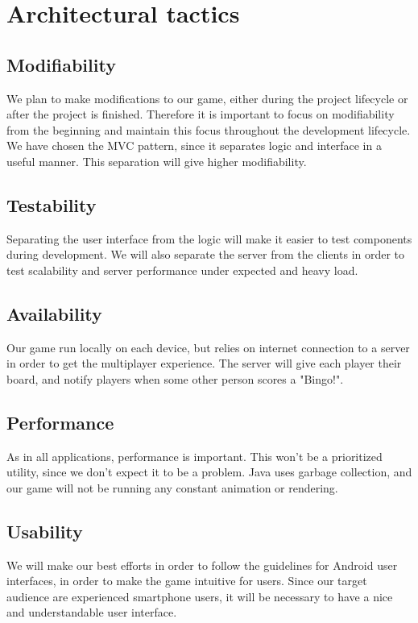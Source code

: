 \section{Architectural tactics}
\label{sec:architecturaltactics}

\subsection{Modifiability} 
We plan to make modifications to our game, either during the project lifecycle or after the project is finished. Therefore it is important to focus on modifiability from the beginning and maintain this focus throughout the development lifecycle. 
We have chosen the MVC pattern, since it separates logic and interface in a useful manner. This separation will give higher modifiability.

\subsection{Testability}
Separating the user interface from the logic will make it easier to test components during development. We will also separate the server from the clients in order to test scalability and server performance under expected and heavy load.


\subsection{Availability} 
Our game run locally on each device, but relies on internet connection to a server in order to get the multiplayer experience. The server will give each player their board, and notify players when some other person scores a "Bingo!". 


\subsection{Performance}
As in all applications, performance is important. This won't be a prioritized utility, since we don't expect it to be a problem. Java uses garbage collection, and our game will not be running any constant animation or rendering.



\subsection{Usability} 
We will make our best efforts in order to follow the guidelines for Android user interfaces, in order to make the game intuitive for users. Since our target audience are experienced smartphone users, it will be necessary to have a nice and understandable user interface. 